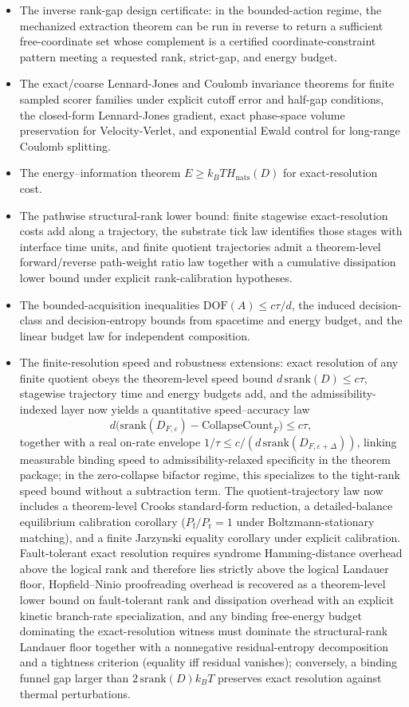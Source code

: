 \begin{itemize}
\item The inverse rank-gap design certificate: in the bounded-action regime, the mechanized extraction theorem can be run in reverse to return a sufficient free-coordinate set whose complement is a certified coordinate-constraint pattern meeting a requested rank, strict-gap, and energy budget.
\item The exact/coarse Lennard-Jones and Coulomb invariance theorems for finite sampled scorer families under explicit cutoff error and half-gap conditions, the closed-form Lennard-Jones gradient, exact phase-space volume preservation for Velocity-Verlet, and exponential Ewald control for long-range Coulomb splitting.
\item The energy--information theorem $E \ge k_B T H_{\mathrm{nats}}(D)$ for exact-resolution cost.
\item The pathwise structural-rank lower bound: finite stagewise exact-resolution costs add along a trajectory, the substrate tick law identifies those stages with interface time units, and finite quotient trajectories admit a theorem-level forward/reverse path-weight ratio law together with a cumulative dissipation lower bound under explicit rank-calibration hypotheses.
\item The bounded-acquisition inequalities $\mathrm{DOF}(A) \le c\tau/d$, the induced decision-class and decision-entropy bounds from spacetime and energy budget, and the linear budget law for independent composition.
\item The finite-resolution speed and robustness extensions: exact resolution of any finite quotient obeys the theorem-level speed bound $d\,\mathrm{srank}(D) \le c\tau$, stagewise trajectory time and energy budgets add, and the admissibility-indexed layer now yields a quantitative speed--accuracy law
\[
d\bigl(\mathrm{srank}(D_{F,\varepsilon})-\mathrm{CollapseCount}_F\bigr)\le c\tau,
\]
together with a real on-rate envelope $1/\tau \le c/(d\,\mathrm{srank}(D_{F,\varepsilon+\Delta}))$, linking measurable binding speed to admissibility-relaxed specificity in the theorem package; in the zero-collapse bifactor regime, this specializes to the tight-rank speed bound without a subtraction term. The quotient-trajectory law now includes a theorem-level Crooks standard-form reduction, a detailed-balance equilibrium calibration corollary ($P_{\mathrm f}/P_{\mathrm r}=1$ under Boltzmann-stationary matching), and a finite Jarzynski equality corollary under explicit calibration. Fault-tolerant exact resolution requires syndrome Hamming-distance overhead above the logical rank and therefore lies strictly above the logical Landauer floor, Hopfield--Ninio proofreading overhead is recovered as a theorem-level lower bound on fault-tolerant rank and dissipation overhead with an explicit kinetic branch-rate specialization, and any binding free-energy budget dominating the exact-resolution witness must dominate the structural-rank Landauer floor together with a nonnegative residual-entropy decomposition and a tightness criterion (equality iff residual vanishes); conversely, a binding funnel gap larger than $2\,\mathrm{srank}(D)k_B T$ preserves exact resolution against thermal perturbations.

\end{itemize}
